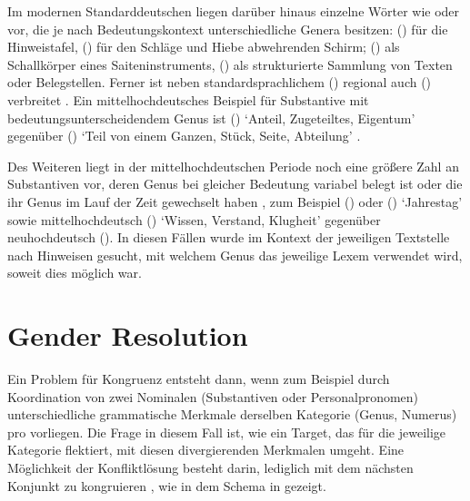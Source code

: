 Im modernen Standarddeutschen liegen darüber hinaus einzelne Wörter wie
 oder  vor, die je nach Bedeutungskontext
unterschiedliche Genera besitzen:  (\NeutI) für die
Hinweistafel,  (\MascI) für den Schläge und Hiebe abwehrenden
Schirm;  (\MascI) als Schallkörper eines Saiteninstruments,
 (\NeutI) als strukturierte Sammlung von Texten oder
Belegstellen. Ferner ist neben standardsprachlichem  (\FemI)
regional auch  (\MascI) verbreitet
\autocite[s.\,v.~\textit{der/die Butter}]{elspassmoeller2003}. Ein
mittelhochdeutsches Beispiel für Substantive mit
bedeutungs\-unterscheidendem Genus ist  (\MascI) `Anteil,
Zugeteiltes, Eigentum' gegenüber  (\NeutI) `Teil von einem
Ganzen, Stück, Seite, Abteilung' \autocite[s.\,v.~\textit{teil}]{lexer:mhdhwb}.

Des Weiteren liegt in der mittelhochdeutschen Periode
noch eine größere Zahl an Substantiven vor, deren Genus bei gleicher Bedeutung
variabel belegt ist oder die ihr Genus im Lauf der Zeit gewechselt haben
\autocite[157--166]{ksw2}, zum Beispiel  (\FemI) oder  (\NeutI) `Jahrestag' sowie mittel\-hoch\-deutsch
 (\FemI) `Wissen, Verstand, Klugheit'
\autocite[vgl.][s.\,v.~\textit{witze}]{lexer:mhdhwb} gegenüber
neu\-hoch\-deutsch  (\MascI). In diesen Fällen
wurde im Kontext der jeweiligen Text\-stelle nach Hinweisen gesucht, mit
welchem Genus das jeweilige Lexem verwendet wird, soweit dies möglich war.


\section{Gender Resolution}
\label{sec:gendres}

Ein Problem für Kongruenz entsteht dann, wenn zum Beispiel durch Koordination
von zwei Nominalen (Substantiven oder Personalpronomen) unterschiedliche
grammatische Merkmale derselben Kategorie (Genus, Numerus) pro
 vorliegen. Die Frage in diesem Fall ist, wie ein Target, das
für die jeweilige Kategorie flektiert, mit diesen divergierenden Merkmalen
umgeht. Eine Möglichkeit der Konfliktlösung besteht darin, lediglich mit dem
nächsten Konjunkt zu kongruieren \autocites[;
vgl.][179--180]{corbett1983}[168--170]{corbett2006}, wie in dem Schema in
 gezeigt.

